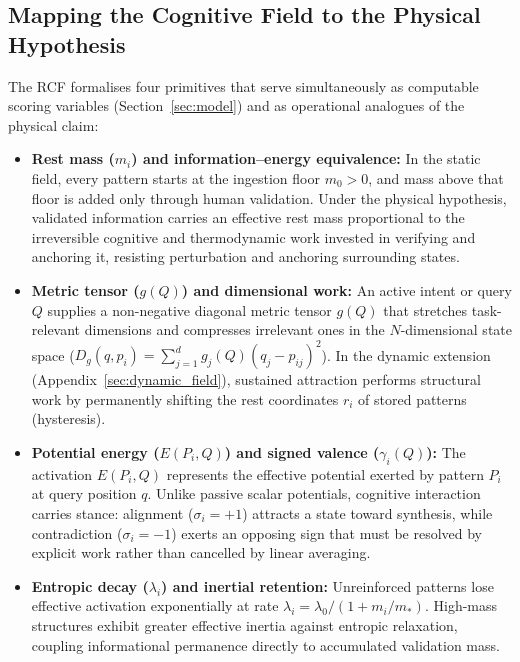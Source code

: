 \documentclass[11pt]{article}
\theoremstyle{remark}
\newcommand{\act}{E}
\newcommand{\dist}{D_g}
\begin{document}
\subsection{Mapping the Cognitive Field to the Physical Hypothesis}
The RCF formalises four primitives that serve simultaneously as computable scoring variables (Section~\ref{sec:model}) and as operational analogues of the physical claim:
\begin{itemize}
  \item \textbf{Rest mass ($m_i$) and information--energy equivalence:} In the static field, every pattern starts at the ingestion floor $m_0 > 0$, and mass above that floor is added only through human validation. Under the physical hypothesis, validated information carries an effective rest mass proportional to the irreversible cognitive and thermodynamic work invested in verifying and anchoring it, resisting perturbation and anchoring surrounding states.
  \item \textbf{Metric tensor ($g(Q)$) and dimensional work:} An active intent or query $Q$ supplies a non-negative diagonal metric tensor $g(Q)$ that stretches task-relevant dimensions and compresses irrelevant ones in the $N$-dimensional state space ($\dist(q,p_i) = \sum_{j=1}^d g_j(Q)(q_j - p_{ij})^2$). In the dynamic extension (Appendix~\ref{sec:dynamic_field}), sustained attraction performs structural work by permanently shifting the rest coordinates $r_i$ of stored patterns (hysteresis).
  \item \textbf{Potential energy ($\act(P_i,Q)$) and signed valence ($\gamma_i(Q)$):} The activation $\act(P_i,Q)$ represents the effective potential exerted by pattern $P_i$ at query position $q$. Unlike passive scalar potentials, cognitive interaction carries stance: alignment ($\sigma_i = +1$) attracts a state toward synthesis, while contradiction ($\sigma_i = -1$) exerts an opposing sign that must be resolved by explicit work rather than cancelled by linear averaging.
  \item \textbf{Entropic decay ($\lambda_i$) and inertial retention:} Unreinforced patterns lose effective activation exponentially at rate $\lambda_i = \lambda_0 / (1 + m_i/m_\ast)$. High-mass structures exhibit greater effective inertia against entropic relaxation, coupling informational permanence directly to accumulated validation mass.
\end{itemize}
\end{document}
